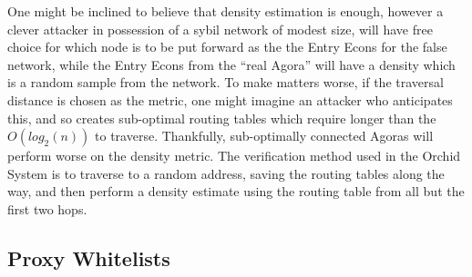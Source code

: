 \documentclass{article}
\newcommand{\mesh}{Orchid}
\begin{document}
One might be inclined to believe that density estimation is enough, however a clever attacker in possession of a sybil network of modest size, will have free choice for which node is to be put forward as the the Entry Econs for the false network, while the Entry Econs from the ``real Agora'' will have a density which is a random sample from the network. To make matters worse, if the traversal distance is chosen as the metric, one might imagine an attacker who anticipates this, and so creates sub-optimal routing tables which require longer than the $O(log_2(n))$ to traverse. Thankfully, sub-optimally connected Agoras will perform worse on the density metric. The verification method used in the \mesh{} System is to traverse to a random address, saving the routing tables along the way, and then perform a density estimate using the routing table from all but the first two hops.






\subsection{Proxy Whitelists}
\end{document}
